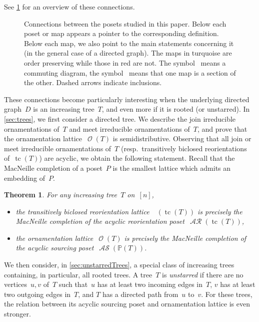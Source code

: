 \documentclass{amsart}
\newtheorem{theorem}{Theorem}[section]
\theoremstyle{definition}
\renewcommand{\c}[1]{\mathcal{#1}} %
\DeclareMathOperator{\tc}{tc} %
\newcommand{\darkblue}{\color{darkblue}} %
\newcommand{\defn}[1]{\textsl{\darkblue #1}} %
\DeclareMathOperator{\Orn}{\c{O}}  %
\DeclareMathOperator{\AReori}{\c{AR}}  %
\DeclareMathOperator{\Rbi}{\c{R}^{bi}}  %
\DeclareMathOperator{\ASour}{\mathcal{AS}}  %
\newcommand{\PP}{\mathbb P} %
\begin{document}
See \cref{fig:allMaps} for an overview of these connections.

\begin{figure}
	\centerline{}
	\caption{Connections between the posets studied in this paper. Below each poset or map appears a pointer to the corresponding definition. Below each map, we also point to the main statements concerning it (in the general case of a directed graph). The maps in turquoise are order preserving while those in red are not. The symbol~\smash{\Large$\circlearrowleft$} means a commuting diagram, the symbol~ means that one map is a section of the other. Dashed arrows indicate inclusions.}
	\label{fig:allMaps}
\end{figure}

\medskip
These connections become particularly interesting when the underlying directed graph~$D$ is an increasing tree~$T$, and even more if it is rooted (or unstarred).
In \cref{sec:trees}, we first consider a directed tree.
We describe the join irreducible ornamentations of~$T$ and meet irreducible ornamentations of~$T$, and prove that the ornamentation lattice~$\Orn(T)$ is semidistributive.
Observing that all join or meet irreducible ornamentations of~$T$ (resp.~transitively biclosed reorientations of~$\tc(T)$) are acyclic, we obtain the following statement.
Recall that the MacNeille completion of a poset~$P$ is the smallest lattice which admits an embedding of~$P$.

\begin{theorem}
\label{thm:main1}
For any increasing tree~$T$ on~$[n]$, 
\begin{itemize}
\item the transitively biclosed reorientation lattice~$\Rbi(\tc(T))$ is precisely the MacNeille completion of the acyclic reorientation poset~$\AReori(\tc(T))$,
\item the ornamentation lattice~$\Orn(T)$ is precisely the MacNeille completion of the acyclic sourcing poset~$\ASour(\PP(T))$.
\end{itemize}
\end{theorem}

We then consider, in \cref{sec:unstarredTrees}, a special class of increasing trees containing, in particular, all rooted trees.
A tree~$T$ is \defn{unstarred} if there are no vertices~$u,v$ of~$T$ such that~$u$ has at least two incoming edges in~$T$, $v$ has at least two outgoing edges in~$T$, and $T$ has a directed path from~$u$ to~$v$.
For these trees, the relation between its acyclic sourcing poset and ornamentation lattice is even stronger.
\end{document}
